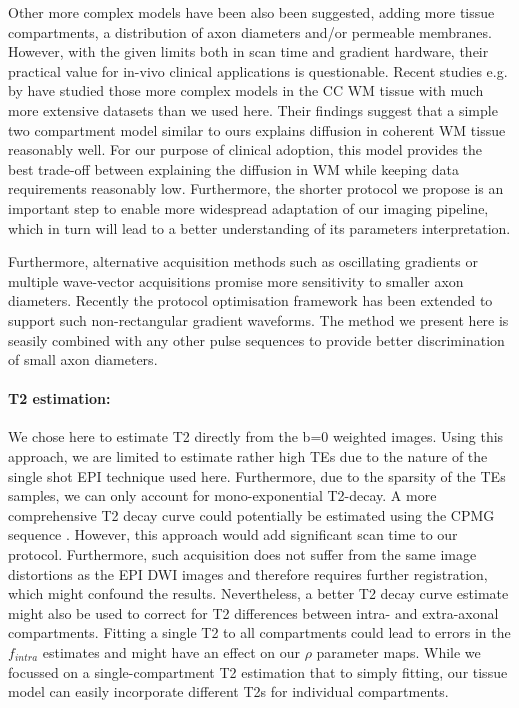 Other more complex models have been also been suggested, adding more tissue compartments, a distribution of axon diameters and/or permeable membranes. However, with the given limits both in scan time and gradient hardware, their practical value for in-vivo clinical applications is questionable. Recent studies e.g. by \citet{Panagiotaki:2012, Ferizi:2012} have studied those more complex models in the CC WM tissue with much more extensive datasets than we used here. Their findings suggest that a simple two compartment model similar to ours explains diffusion in coherent WM tissue reasonably well. For our purpose of clinical adoption, this model provides the best trade-off between explaining the diffusion in WM while keeping data requirements reasonably low. Furthermore, the shorter protocol we propose is an important step to enable more widespread adaptation of our imaging pipeline, which in turn will lead to a better understanding of its parameters interpretation.


Furthermore, alternative acquisition methods such as oscillating gradients \citep{Does:2003, Colvin:2008} or multiple wave-vector acquisitions \citep{Komlosh:2008,Koch:2008,Avram:2012} promise more sensitivity to smaller axon diameters. Recently the protocol optimisation framework has been extended to support such non-rectangular gradient waveforms\citet{Drobnjak:2010,Siow:2012a}. The method we present here is seasily combined with any other pulse sequences to provide better discrimination of small axon diameters.

\paragraph{T2 estimation: } We chose here to estimate T2 directly from the b=0 weighted images. Using this approach, we are limited to estimate rather high \glspl{TE} due to the nature of the single shot EPI technique used here. Furthermore, due to the sparsity of the \glspl{TE} samples, we can only account for mono-exponential T2-decay. A more comprehensive T2 decay curve could potentially be estimated using the \gls{CPMG} sequence \citep{Pell:2006}. However, this approach would add significant scan time to our protocol. Furthermore, such acquisition does not suffer from the same image distortions as the EPI DWI images and therefore requires further registration, which might confound the results. Nevertheless, a better T2 decay curve estimate might also be used to correct for T2 differences between intra- and extra-axonal compartments. Fitting a single T2 to all compartments could lead to errors in  the $f_{intra}$ estimates and might have an effect on our $\rho$ parameter maps. While we focussed on a single-compartment T2 estimation that to simply fitting, our tissue model can easily incorporate different T2s for individual compartments. 

